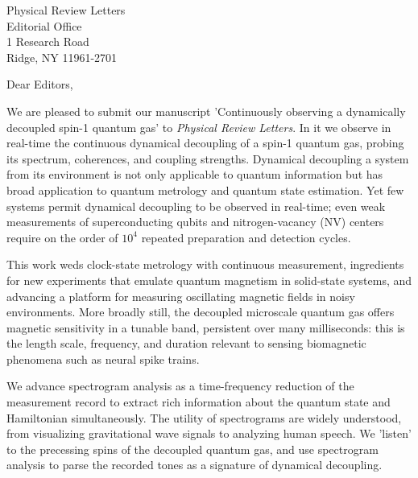 \documentclass[10pt,letterpaper]{letter} %
\begin{document}

\begin{letter}{
	Physical Review Letters\\
	Editorial Office\\
	1 Research Road \\
	Ridge, NY 11961-2701\\
}


\opening{Dear Editors,}

We are pleased to submit our manuscript 'Continuously observing a dynamically decoupled spin-1 quantum gas' to \textit{Physical Review Letters}.
In it we observe in real-time the continuous dynamical decoupling of a spin-1 quantum gas, probing its spectrum, coherences, and coupling strengths.
Dynamical decoupling a system from its environment is not only applicable to quantum information but has broad application to quantum metrology and quantum state estimation.
Yet few systems permit dynamical decoupling to be observed in real-time; even weak measurements of superconducting qubits and nitrogen-vacancy (NV) centers require on the order of $10^4$ repeated preparation and detection cycles.

This work weds clock-state metrology with continuous measurement, ingredients for new experiments that emulate quantum magnetism in solid-state systems, and advancing a platform for measuring oscillating magnetic fields in noisy environments.
More broadly still, the decoupled microscale quantum gas offers magnetic sensitivity in a tunable band, persistent over many milliseconds: this is the length scale, frequency, and duration relevant to sensing biomagnetic phenomena such as neural spike trains.

We advance spectrogram analysis as a time-frequency reduction of the measurement record to extract rich information about the quantum state and Hamiltonian simultaneously.
The utility of spectrograms are widely understood, from visualizing gravitational wave signals to analyzing human speech.
We 'listen' to the precessing spins of the decoupled quantum gas, and use spectrogram analysis to parse the recorded tones as a signature of dynamical decoupling.


\end{letter}
\end{document}
